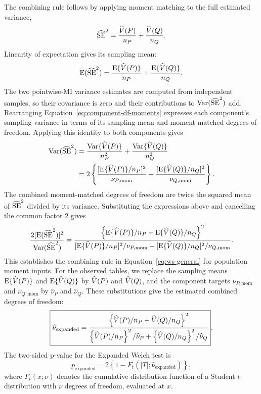 \medskip
{}

The combining rule follows by applying moment matching to the full
estimated variance,
\begin{equation*}
  \widehat{\operatorname{SE}}^2=\frac{\widehat V(P)}{n_P}+\frac{\widehat V(Q)}{n_Q}.
\end{equation*}
Linearity of expectation gives its sampling mean:
\begin{equation*}
  \operatorname{E}(\widehat{\operatorname{SE}}^2)
  =\frac{\operatorname{E}\{\widehat V(P)\}}{n_P}
   +\frac{\operatorname{E}\{\widehat V(Q)\}}{n_Q}.
\end{equation*}
The two pointwise-MI variance estimates are computed from independent
samples, so their covariance is zero and their contributions to
\(\operatorname{Var}(\widehat{\operatorname{SE}}^2)\) add. Rearranging
Equation~\eqref{eq:component-df-moments} expresses each component's sampling
variance in terms of its sampling mean and moment-matched degrees of
freedom. Applying this identity to both components gives
\begin{align*}
  \operatorname{Var}(\widehat{\operatorname{SE}}^2)
  &=\frac{\operatorname{Var}\{\widehat V(P)\}}{n_P^2}
    +\frac{\operatorname{Var}\{\widehat V(Q)\}}{n_Q^2}\\
  &=2\left\{
    \frac{[\operatorname{E}\{\widehat V(P)\}/n_P]^2}{\nu_{P,\mathrm{mom}}}
    +\frac{[\operatorname{E}\{\widehat V(Q)\}/n_Q]^2}{\nu_{Q,\mathrm{mom}}}
    \right\}.
\end{align*}
The combined moment-matched degrees of freedom are twice the squared mean
of \(\widehat{\operatorname{SE}}^2\) divided by its variance. Substituting the expressions above
and cancelling the common factor \(2\) gives
\begin{equation*}
  \frac{2[\operatorname{E}(\widehat{\operatorname{SE}}^2)]^2}{\operatorname{Var}(\widehat{\operatorname{SE}}^2)}
  =\frac{
    \left\{\operatorname{E}\{\widehat V(P)\}/n_P+\operatorname{E}\{\widehat V(Q)\}/n_Q\right\}^2
    }{
    [\operatorname{E}\{\widehat V(P)\}/n_P]^2/\nu_{P,\mathrm{mom}}
    +[\operatorname{E}\{\widehat V(Q)\}/n_Q]^2/\nu_{Q,\mathrm{mom}}
    }.
\end{equation*}
This establishes the combining rule in Equation~\eqref{eq:ws-general} for
population moment inputs. For the observed tables, we replace the sampling
means \(\operatorname{E}\{\widehat V(P)\}\) and \(\operatorname{E}\{\widehat V(Q)\}\) by \(\widehat V(P)\) and
\(\widehat V(Q)\), and the component targets \(\nu_{P,\mathrm{mom}}\) and
\(\nu_{Q,\mathrm{mom}}\) by \(\widehat\nu_P\) and \(\widehat\nu_Q\).
These substitutions give the estimated combined degrees of freedom:
\begin{equation}
  \boxed{
  \widehat\nu_{\mathrm{expanded}}
  =
  \frac{
  \left\{\widehat V(P)/n_P+\widehat V(Q)/n_Q\right\}^2
  }{
  \left\{\widehat V(P)/n_P\right\}^2/\widehat\nu_P
  +
  \left\{\widehat V(Q)/n_Q\right\}^2/\widehat\nu_Q
  }
  }.
  \label{eq:expanded-df}
\end{equation}
The two-sided p-value for the Expanded Welch test is
\begin{equation}
  p_{\mathrm{expanded}}
  =2\left\{1-F_t(|T|;\widehat\nu_{\mathrm{expanded}})\right\},
  \label{eq:expanded-p}
\end{equation}
where \(F_t(x;\nu)\) denotes the cumulative distribution function of a
Student \(t\) distribution with \(\nu\) degrees of freedom, evaluated at \(x\).

